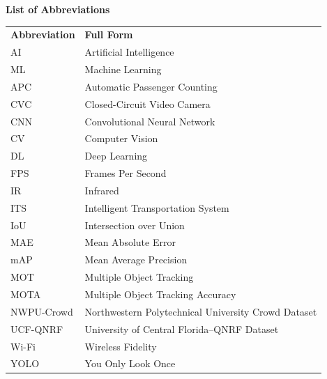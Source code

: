 
\begin{center}
	{\Large\bfseries List of Abbreviations}
\end{center}

\begin{longtable}{p{} p{}}
	\textbf{Abbreviation} & \textbf{Full Form} \\[0.3cm]
	
	AI          & Artificial Intelligence \\
	ML          & Machine Learning \\
	APC         & Automatic Passenger Counting \\
	CVC         & Closed-Circuit Video Camera \\
	CNN         & Convolutional Neural Network \\
	CV          & Computer Vision \\
	DL          & Deep Learning \\
	FPS         & Frames Per Second \\
	IR          & Infrared \\
	ITS         & Intelligent Transportation System \\
	IoU         & Intersection over Union \\
	MAE         & Mean Absolute Error \\
	mAP         & Mean Average Precision \\
	MOT         & Multiple Object Tracking \\
	MOTA        & Multiple Object Tracking Accuracy \\
	NWPU-Crowd  & Northwestern Polytechnical University Crowd Dataset \\
	UCF-QNRF    & University of Central Florida--QNRF Dataset \\
	Wi-Fi       & Wireless Fidelity \\
	YOLO        & You Only Look Once \\

\end{longtable}

\clearpage
